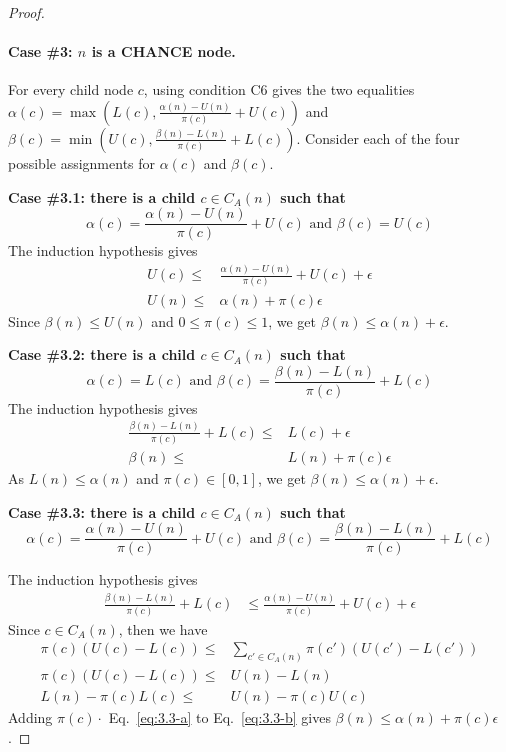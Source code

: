 \documentclass[runningheads]{llncs}
\newcommand{\pess}{\mathit{L}}
\newcommand{\opti}{\mathit{U}}
\begin{document}
\begin{proof}
\paragraph{Case \#3: $n$ is a CHANCE node.} 
For every child node $c$, using condition C6 gives the two equalities 
$\alpha(c)=\max(\pess(c), \frac{\alpha(n)-\opti(n)}{\pi(c)}+\opti(c))$ 
and \linebreak $\beta(c)=\min(\opti(c), \frac{\beta(n)-\pess(n)}{\pi(c)}+\pess(c))$.
Consider each of the four possible assignments for $\alpha(c)$ and $\beta(c)$. 


\noindent \textbf{Case \#3.1: there is a child $c\in C_A(n)$ such that 
\[\alpha(c)=\frac{\alpha(n)-\opti(n)}{\pi(c)}+\opti(c) 
\text{ and } \beta(c)=\opti(c)\]}
\noindent The induction hypothesis gives
\begin{align}
\opti(c) \leq & \frac{\alpha(n)-\opti(n)}{\pi(c)}+\opti(c)+\epsilon \\
\opti(n) \leq & \alpha(n) + \pi(c)\epsilon
\end{align}
Since $\beta(n)\!\leq\!\!\opti(n)$ and $0\!\leq\!\pi(c)\!\leq\!1$, we get $\beta(n)\!\leq\!\alpha(n) + \epsilon$.

\textbf{Case \#3.2: there is a child $c\in C_A(n)$ such that
\[ \alpha(c)=\pess(c) \text{ and } \beta(c)=\frac{\beta(n)-\pess(n)}{\pi(c)}+\pess(c) \]}
\noindent The induction hypothesis gives
\begin{align}
\frac{\beta(n)-\pess(n)}{\pi(c)}+\pess(c) \leq & \pess(c)+\epsilon \\
\beta(n) \leq & \pess(n) + \pi(c) \epsilon
\end{align}
As $\pess(n) \leq \alpha(n)$ and $\pi(c)$$\in$$[0,1]$, we get $\beta(n) \leq \alpha(n) + \epsilon$.


\textbf{Case \#3.3: there is a child $c\in C_A(n)$ such that 
\[\alpha(c)=\frac{\alpha(n)-\opti(n)}{\pi(c)}+\opti(c) \text{ and } \beta(c)=\frac{\beta(n)-\pess(n)}{\pi(c)}+\pess(c)\]}
 
\noindent The induction hypothesis gives
\begin{align}
\frac{\beta(n)-\pess(n)}{\pi(c)}+\pess(c) &\leq \frac{\alpha(n)-\opti(n)}{\pi(c)}+\opti(c) + \epsilon\label{eq:3.3-a}
\end{align}
Since $c\in C_A(n)$, then we have
\begin{align}
\pi(c)(\opti(c)-\pess(c)) \leq & \!\!\sum_{c'\in C_A(n)\!\!\!\!\!\!\!\!\!} \!\pi(c')(\opti(c')-\pess(c'))\\
\pi(c)(\opti(c)-\pess(c)) \leq & \opti(n)-\pess(n)\\
\pess(n) - \pi(c)\pess(c) \leq & \opti(n)-\pi(c)\opti(c) \label{eq:3.3-b}
\end{align}
Adding $\pi(c) \cdot$ Eq.~\eqref{eq:3.3-a} to Eq.~\eqref{eq:3.3-b} gives $\beta(n) \leq \alpha(n)+\pi(c)\epsilon$.


\end{proof}
\end{document}
